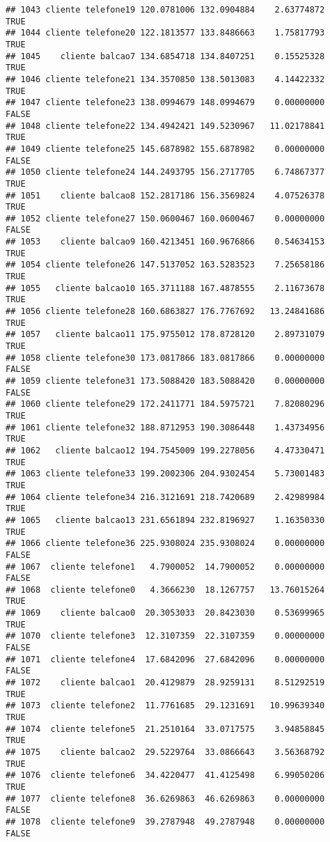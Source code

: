 \documentclass[
]{article}
\begin{document}
\begin{verbatim}
## 1043 cliente telefone19 120.0781006 132.0904884    2.63774872     TRUE
## 1044 cliente telefone20 122.1813577 133.8486663    1.75817793     TRUE
## 1045    cliente balcao7 134.6854718 134.8407251    0.15525328     TRUE
## 1046 cliente telefone21 134.3570850 138.5013083    4.14422332     TRUE
## 1047 cliente telefone23 138.0994679 148.0994679    0.00000000    FALSE
## 1048 cliente telefone22 134.4942421 149.5230967   11.02178841     TRUE
## 1049 cliente telefone25 145.6878982 155.6878982    0.00000000    FALSE
## 1050 cliente telefone24 144.2493795 156.2717705    6.74867377     TRUE
## 1051    cliente balcao8 152.2817186 156.3569824    4.07526378     TRUE
## 1052 cliente telefone27 150.0600467 160.0600467    0.00000000    FALSE
## 1053    cliente balcao9 160.4213451 160.9676866    0.54634153     TRUE
## 1054 cliente telefone26 147.5137052 163.5283523    7.25658186     TRUE
## 1055   cliente balcao10 165.3711188 167.4878555    2.11673678     TRUE
## 1056 cliente telefone28 160.6863827 176.7767692   13.24841686     TRUE
## 1057   cliente balcao11 175.9755012 178.8728120    2.89731079     TRUE
## 1058 cliente telefone30 173.0817866 183.0817866    0.00000000    FALSE
## 1059 cliente telefone31 173.5088420 183.5088420    0.00000000    FALSE
## 1060 cliente telefone29 172.2411771 184.5975721    7.82080296     TRUE
## 1061 cliente telefone32 188.8712953 190.3086448    1.43734956     TRUE
## 1062   cliente balcao12 194.7545009 199.2278056    4.47330471     TRUE
## 1063 cliente telefone33 199.2002306 204.9302454    5.73001483     TRUE
## 1064 cliente telefone34 216.3121691 218.7420689    2.42989984     TRUE
## 1065   cliente balcao13 231.6561894 232.8196927    1.16350330     TRUE
## 1066 cliente telefone36 225.9308024 235.9308024    0.00000000    FALSE
## 1067  cliente telefone1   4.7900052  14.7900052    0.00000000    FALSE
## 1068  cliente telefone0   4.3666230  18.1267757   13.76015264     TRUE
## 1069    cliente balcao0  20.3053033  20.8423030    0.53699965     TRUE
## 1070  cliente telefone3  12.3107359  22.3107359    0.00000000    FALSE
## 1071  cliente telefone4  17.6842096  27.6842096    0.00000000    FALSE
## 1072    cliente balcao1  20.4129879  28.9259131    8.51292519     TRUE
## 1073  cliente telefone2  11.7761685  29.1231691   10.99639340     TRUE
## 1074  cliente telefone5  21.2510164  33.0717575    3.94858845     TRUE
## 1075    cliente balcao2  29.5229764  33.0866643    3.56368792     TRUE
## 1076  cliente telefone6  34.4220477  41.4125498    6.99050206     TRUE
## 1077  cliente telefone8  36.6269863  46.6269863    0.00000000    FALSE
## 1078  cliente telefone9  39.2787948  49.2787948    0.00000000    FALSE

\end{verbatim}
\end{document}
